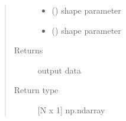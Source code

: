 \documentclass[letterpaper,10pt,english,openany,oneside]{sphinxmanual}
\begin{document}
\begin{fulllineitems}
\begin{quote}
\begin{description}
\begin{itemize}
\item {} 
 () \textendash{} shape parameter

\item {} 
 () \textendash{} shape parameter

\end{itemize}

\item[{Returns}] \leavevmode
{} \textendash{} output data

\item[{Return type}] \leavevmode
{[}N x 1{]} np.ndarray

\end{description}\end{quote}

\end{fulllineitems}

\end{document}
